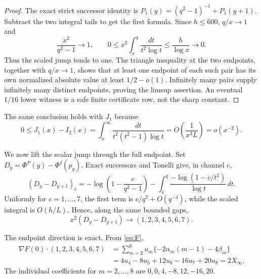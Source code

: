 \documentclass[11pt]{article}
\theoremstyle{definition}
\theoremstyle{remark}
\newcommand{\PhiP}{\Phi^{P}}
\newcommand{\PhiI}{\Phi^{I}}
\begin{document}
\begin{proof}
The exact strict successor identity is
$P_1(y)=(q^2-1)^{-1}+P_1(y+1)$.  Subtract the two integral tails to get
the first formula.  Since $h\le600$, $q/x\to1$ and
\[
 \frac{x^2}{q^2-1}\to1,
 \qquad
 0\le x^2\int_x^q\frac{dt}{t^2\log t}
 \le\frac{h}{\log x}\to0.
\]
Thus the scaled jump tends to one.  The triangle inequality at the two
endpoints, together with $q/x\to1$, shows that at least one endpoint of
each such pair has its own normalized absolute value at least
$1/2-o(1)$.  Infinitely many pairs supply infinitely many distinct
endpoints, proving the limsup assertion.  An eventual $1/16$ lower
witness is a safe finite certificate row, not the sharp constant.
\end{proof}

The same conclusion holds with $J_1$ because
\begin{equation}
 0\le J_1(x)-I_2(x)
 =\int_x^\infty\frac{dt}{t^2(t^2-1)\log t}
 =O\!\left(\frac1{x^3L}\right)=o(x^{-2}).
 \label{eq:J1-I2}
\end{equation}

We now lift the scalar jump through the full endpoint.  Set
$D_y=\PhiP(y)-\PhiI(p_y)$.  Exact successors and Tonelli give, in channel
$c$,
\begin{equation}
 (D_y-D_{y+1})_c
 =-\log\!\left(1-\frac{c}{q^2-1}\right)
 -\int_x^q\frac{-\log(1-c/t^2)}{\log t}\,dt.
 \label{eq:vector-jump}
\end{equation}
Uniformly for $c=1,\ldots,7$, the first term is
$c/q^2+O(q^{-4})$, while the scaled integral is $O(h/L)$.  Hence, along
the same bounded gaps,
\begin{equation}
 x^2(D_y-D_{y+1})\longrightarrow(1,2,3,4,5,6,7).
 \label{eq:rank-one-direction}
\end{equation}

The endpoint direction is exact.  From \eqref{eq:F},
\begin{align}
 \nabla F(0)\mathbin{\cdot}(1,2,3,4,5,6,7)
 &=\sum_{m=2}^8u_m\{-2\alpha_m(m-1)-4\beta_m\}\\
 &=4u_4-8u_5+12u_6-16u_7+20u_8
 =2X_\infty.
 \label{eq:gradient-direction}
\end{align}
The individual coefficients for $m=2,\ldots,8$ are
$0,0,4,-8,12,-16,20$.
\end{document}
